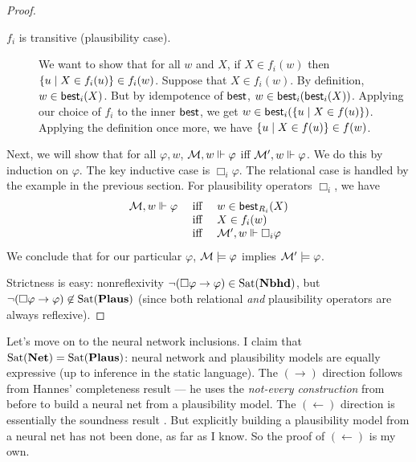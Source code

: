 \documentclass[letterpaper]{article}
\begin{document}
\begin{proof}
\begin{description}
        \item[$f_i$ is transitive (plausibility case).]
        We want to show that for all $w$ and $X$, if $X \in f_i(w)$ then $\{ u \mid X \in f_i(u) \} \in f_i(w)$.  Suppose that $X \in f_i(w)$.  By definition, $w \in \mathsf{best}_i(X)$.  But by idempotence of $\mathsf{best}$, $w \in \mathsf{best}_i(\mathsf{best}_i(X))$.  Applying our choice of $f_i$ to the inner $\mathsf{best}$, we get $w \in \mathsf{best}_i(\{ u \mid X \in f(u) \})$.  Applying the definition once more, we have $\{ u \mid X \in f(u) \} \in f(w)$.

    \end{description}

    Next, we will show that for all $\varphi, w$, $\mathcal{M}, w \Vdash \varphi$ iff $\mathcal{M}', w \Vdash \varphi$.  We do this by induction on $\varphi$.  The key inductive case is $\Box_i \varphi$.  The relational case is handled by the example in the previous section.  For plausibility operators $\Box_i$, we have
    \[
    \begin{array}{lcl}
        \mathcal{M}, w \Vdash \varphi & \mbox{ iff } & w \in \mathsf{best}_{R_i}(X) \\
        & \mbox{ iff } & X \in f_i(w) \\
        & \mbox{ iff } & \mathcal{M}', w \Vdash \Box_i \varphi
    \end{array}
    \]
    We conclude that for our particular $\varphi$, $\mathcal{M} \models \varphi$ implies $\mathcal{M}' \models \varphi$.

    Strictness is easy: nonreflexivity $\neg (\Box \varphi \to \varphi) \in \mathrm{Sat}( \textrm{\textbf{Nbhd}} )$, but $\neg (\Box \varphi \to \varphi) \not \in \mathrm{Sat}( \textrm{\textbf{Plaus}} )$ (since both relational \emph{and} plausibility operators are always reflexive).
\end{proof}

Let's move on to the neural network inclusions.  I claim that $\mathrm{Sat}( \textrm{\textbf{Net}} ) = \mathrm{Sat}( \textrm{\textbf{Plaus}} )$: neural network and plausibility models are equally expressive (up to inference in the static language).  The $(\to)$ direction follows from Hannes' completeness result \cite{leitgeb2001nonmonotonic, leitgeb2003nonmonotonic} --- he uses the \emph{not-every construction} from before to build a neural net from a plausibility model.  The $(\leftarrow)$ direction is essentially the soundness result \cite{leitgeb2001nonmonotonic, leitgeb2003nonmonotonic}. But explicitly building a plausibility model from a neural net has not been done, as far as I know.  So the proof of $(\leftarrow)$ is my own.

\end{document}

